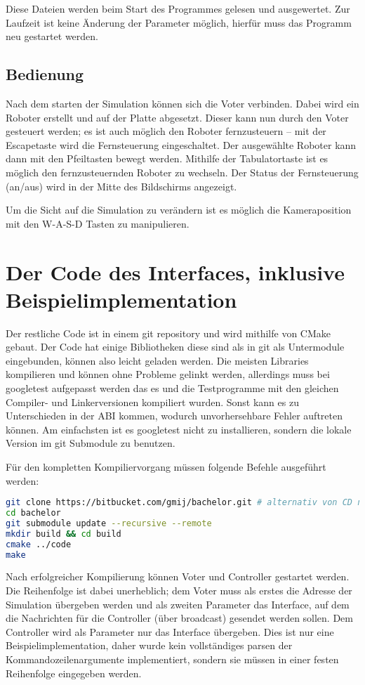 \documentclass[
    12pt,
    bibliography=totoc,
    ngerman,
    enabledeprecatedfontcommands
]{scrartcl}
\begin{document}
Diese Dateien werden beim Start des Programmes gelesen und ausgewertet. Zur Laufzeit ist keine {\"{A}}nderung der Parameter m{\"{o}}glich, hierf{\"{u}}r muss das Programm
neu gestartet werden.

\subsection{Bedienung}
Nach dem starten der Simulation k{\"{o}}nnen sich die Voter verbinden. Dabei wird ein Roboter erstellt und auf der Platte abgesetzt. Dieser kann nun durch den Voter
gesteuert werden; es ist auch m{\"{o}}glich den Roboter fernzusteuern -- mit der Escapetaste wird die Fernsteuerung eingeschaltet. Der ausgew{\"{a}}hlte Roboter kann
dann mit den Pfeiltasten bewegt werden. Mithilfe der Tabulatortaste ist es m{\"{o}}glich den fernzusteuernden Roboter zu wechseln. Der Status der Fernsteuerung (an/aus)
wird in der Mitte des Bildschirms angezeigt.

Um die Sicht auf die Simulation zu ver{\"{a}}ndern ist es m{\"{o}}glich die Kameraposition mit den W-A-S-D Tasten zu manipulieren.


\section{Der Code des Interfaces, inklusive Beispielimplementation}
Der restliche Code ist in einem git repository und wird mithilfe von CMake gebaut. Der Code hat einige Bibliotheken
diese sind als in git als Untermodule eingebunden, k{\"{o}}nnen also leicht geladen werden.
Die meisten Libraries kompilieren und k{\"{o}}nnen ohne Probleme gelinkt werden, allerdings muss bei googletest aufgepasst werden das es und die Testprogramme mit den
gleichen Compiler- und Linkerversionen kompiliert wurden. Sonst kann es zu Unterschieden in der ABI kommen, wodurch unvorhersehbare Fehler auftreten k{\"{o}}nnen. Am einfachsten
ist es googletest nicht zu installieren, sondern die lokale Version im git Submodule zu benutzen.

F{\"{u}}r den kompletten Kompiliervorgang m{\"{u}}ssen folgende Befehle ausgef{\"{u}}hrt werden:
\begin{lstlisting}[frame=single, language=Bash] 
git clone https://bitbucket.com/gmij/bachelor.git # alternativ von CD nehmen
cd bachelor
git submodule update --recursive --remote
mkdir build && cd build
cmake ../code
make
\end{lstlisting}

Nach erfolgreicher Kompilierung k{\"{o}}nnen Voter und Controller gestartet werden. Die Reihenfolge ist dabei unerheblich; dem Voter muss als erstes die Adresse der Simulation
{\"{u}}bergeben werden und als zweiten Parameter das Interface, auf dem die Nachrichten f{\"{u}}r die Controller ({\"{u}}ber broadcast) gesendet werden sollen. Dem Controller
wird als Parameter nur das Interface {\"{u}}bergeben. Dies ist nur eine Beispielimplementation, daher wurde kein vollst{\"{a}}ndiges parsen der Kommandozeilenargumente
implementiert, sondern sie m{\"{u}}ssen in einer festen Reihenfolge eingegeben werden.
\end{document}
